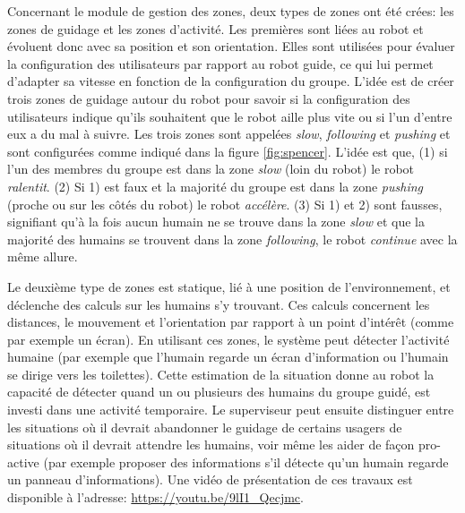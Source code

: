 \documentclass[a4paper,11pt,twoside]{StyleThese}
\begin{document}
Concernant le module de gestion des zones, deux types de zones ont été crées: les zones de guidage et les zones d'activité. Les premières sont liées au robot et évoluent donc avec sa position et son orientation. Elles sont utilisées pour évaluer la configuration des utilisateurs par rapport au robot guide, ce qui lui permet d'adapter sa vitesse en fonction de la configuration du groupe.
L'idée est de créer trois zones de guidage autour du robot pour savoir si la configuration des utilisateurs indique qu'ils souhaitent que le robot aille plus vite ou si l'un d'entre eux a du mal à suivre.
Les trois zones sont appelées \textit{slow}, \textit{following} et \textit{pushing} et sont configurées comme indiqué dans la figure \ref{fig:spencer}.
L'idée est que, (1) si l'un des membres du groupe est dans la zone \textit{slow} (loin du robot) le robot \textit{ralentit}. (2) Si 1) est faux et la majorité du groupe est dans la zone \textit{pushing} (proche ou sur les côtés du robot) le robot \textit{accélère}. (3) Si 1) et 2) sont fausses, signifiant qu'à la fois aucun humain ne se trouve dans la zone \textit{slow} et que la majorité des humains se trouvent dans la zone \textit{following}, le robot \textit{continue} avec la même allure.

Le deuxième type de zones est statique, lié à une position de l'environnement, et déclenche des calculs sur les humains s'y trouvant. Ces calculs concernent les distances, le mouvement et l'orientation par rapport à un point d'intérêt (comme par exemple un écran). En utilisant ces zones, le système peut détecter l'activité humaine (par exemple que l'humain regarde un écran d'information ou l'humain se dirige vers les toilettes). Cette estimation de la situation donne au robot la capacité de détecter quand un ou plusieurs des humains du groupe guidé, est investi dans une activité temporaire. Le superviseur peut ensuite distinguer entre les situations où il devrait abandonner le guidage de certains usagers de situations où il devrait attendre les humains, voir même les aider de façon pro-active (par exemple proposer des informations s'il détecte qu'un humain regarde un panneau d'informations). Une vidéo de présentation de ces travaux est disponible à l'adresse: \url{https://youtu.be/9lI1_Qecjmc}.

\end{document}
